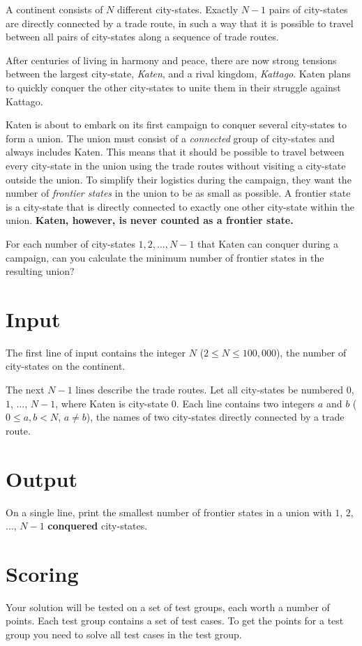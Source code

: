 A continent consists of $N$ different city-states. Exactly $N - 1$ pairs of city-states are
directly connected by a trade route, in such a way that it is possible to travel between all
pairs of city-states along a sequence of trade routes.

After centuries of living in harmony and peace, there are now strong tensions between the
largest city-state, \emph{Katen}, and a rival kingdom, \emph{Kattago}. Katen plans to quickly
conquer the other city-states to unite them in their struggle against Kattago.

Katen is about to embark on its first campaign to conquer several city-states to form a union.
The union must consist of a \emph{connected} group of city-states and always includes Katen.
This means that it should be possible to travel between every city-state in the union using the
trade routes without visiting a city-state outside the union. To simplify their logistics during
the campaign, they want the number of \emph{frontier states} in the union to be as small as possible.
A frontier state is a city-state that is directly connected to exactly one other city-state within the
union. \textbf{Katen, however, is never counted as a frontier state.}

For each number of city-states $1, 2, \dots, N-1$ that Katen can conquer during a campaign, can you calculate
the minimum number of frontier states in the resulting union?

\section*{Input}
The first line of input contains the integer $N$ ($2 \leq N \leq 100,000$), the number of city-states on the continent.

The next $N - 1$ lines describe the trade routes.
Let all city-states be numbered $0$, $1$, $\dots$, $N - 1$, where Katen is city-state $0$.
Each line contains two integers $a$ and $b$ ($0 \leq a, b < N$, $a \neq b$), the names of
two city-states directly connected by a trade route.

\section*{Output}
On a single line, print the smallest number of frontier states in a union with $1$, $2$, $\dots$, $N - 1$ \textbf{conquered} city-states.

\section*{Scoring}
Your solution will be tested on a set of test groups, each worth a number of points. Each test group contains
a set of test cases. To get the points for a test group you need to solve all test cases in the test group.

